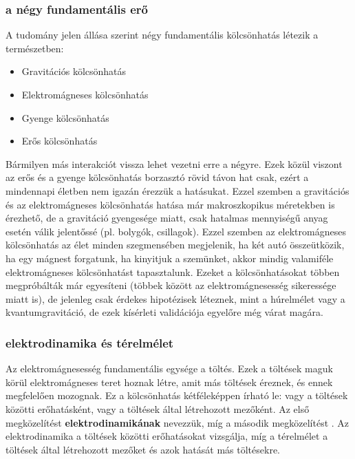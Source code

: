 \documentclass[a4paper,12pt]{article}
\begin{document}
\subsubsection{a négy fundamentális erő}
A tudomány jelen állása szerint négy fundamentális kölcsönhatás létezik a természetben:
\begin{itemize}
    \item Gravitációs kölcsönhatás
    \item Elektromágneses kölcsönhatás
    \item Gyenge kölcsönhatás
    \item Erős kölcsönhatás
\end{itemize}
Bármilyen más interakciót vissza lehet vezetni erre a négyre. Ezek közül viszont az erős és a gyenge kölcsönhatás borzasztó rövid távon hat csak, ezért a mindennapi életben
nem igazán érezzük a hatásukat. Ezzel szemben a gravitációs és az elektromágneses kölcsönhatás hatása már makroszkopikus méretekben is érezhető, de a gravitáció gyengesége miatt,
csak hatalmas mennyiségű anyag esetén válik jelentőssé (pl. bolygók, csillagok). Ezzel szemben az elektromágneses kölcsönhatás az élet minden szegmensében megjelenik, ha 
két autó összeütközik, ha egy mágnest forgatunk, ha kinyitjuk a szemünket, akkor mindig valamiféle elektromágneses kölcsönhatást tapasztalunk.
\newline
\newline
Ezeket a kölcsönhatásokat többen megpróbálták már egyesíteni (többek között az elektromágnesesség sikeressége miatt is), de jelenleg csak érdekes hipotézisek léteznek, 
mint a húrelmélet vagy a kvantumgravitáció, de ezek kísérleti validációja egyelőre még várat magára.

\subsubsection{elektrodinamika és térelmélet}
Az elektromágnesesség fundamentális egysége a töltés. Ezek a töltések maguk körül elektromágneses teret hoznak létre, amit más töltések éreznek, és ennek megfelelően mozognak.
Ez a kölcsönhatás kétféleképpen írható le: vagy a töltések közötti erőhatásként, vagy a töltések által létrehozott mezőként. Az első megközelítést \textbf{elektrodinamikának} nevezzük,
míg a második megközelítést . Az elektrodinamika a töltések közötti erőhatásokat vizsgálja, míg a térelmélet a töltések által létrehozott mezőket és azok hatását más töltésekre.
\end{document}
